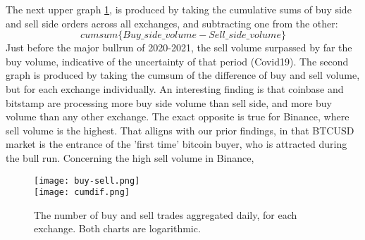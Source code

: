 The next upper graph \ref{fig:cum}, is produced by taking the cumulative sums of buy side and sell side orders across all exchanges, and subtracting one from the other: 
\[ cumsum\{Buy\_side\_volume - Sell\_side\_volume\} \]
Just before the major bullrun of 2020-2021, the sell volume surpassed by far the buy volume, indicative of the uncertainty of that period (Covid19). The second graph is produced by taking the cumsum of the difference of buy and sell volume, but for each exchange individually. An interesting finding is that coinbase and bitstamp are processing more buy side volume than sell side, and more buy volume than any other exchange. The exact opposite is true for Binance, where sell volume is the highest. That alligns with our prior findings, in that BTCUSD market is the entrance of the 'first time' bitcoin buyer, who is attracted during the bull run. Concerning the high sell volume in Binance, 

\begin{figure}[H]
	\centering
    \texttt{[image: buy-sell.png]} \\
    \texttt{[image: cumdif.png]} \\ 
	\caption{The number of buy and sell trades aggregated daily, for each exchange. Both charts are logarithmic.}
    \label{fig:cum}
\end{figure}
